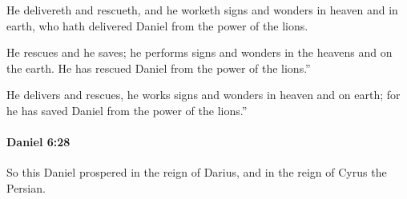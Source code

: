 			\begin{versebox}
					\item[BHS] 
					\item[LXX] 
					\item[ASV] He delivereth and rescueth, and he worketh signs and wonders in heaven and in earth, who hath delivered Daniel from the power of the lions.
					\item[NIV] He rescues and he saves; he performs signs and wonders in the heavens and on the earth. He has rescued Daniel from the power of the lions.”
					\item[NRSV] He delivers and rescues, he works signs and wonders in heaven and on earth; for he has saved Daniel from the power of the lions.”
			\end{versebox}

		\paragraph{Daniel 6:28} %
			\label{DANIEL-6-28}

			So this Daniel prospered in the reign of Darius, and in the reign of Cyrus the Persian.

